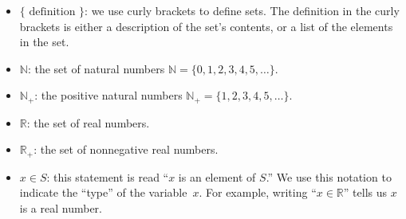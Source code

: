 		\begin{itemize}


			\item $\{ \textrm{  definition  } \}$:
				we use curly brackets to define sets.
				The definition in the curly brackets is either a description of the set's contents,
				or a list of the elements in the set.

			\item $\mathbb{N}$: the set of natural numbers $\mathbb{N} = \{0,1,2,3,4,5,\ldots\}$.

			\item $\mathbb{N}_+$: the positive natural numbers $\mathbb{N}_+ = \{1,2,3,4,5,\ldots\}$.

			\item	$\mathbb{R}$: the set of real numbers.

			\item	$\mathbb{R}_+$: the set of nonnegative real numbers.

			\item $x \in S$: this statement is read ``$x$ is an element of $S$.'' %
				We use this notation to indicate the ``type'' of the variable~$x$.
				For example,
				writing ``$x \in \mathbb{R}$'' tells us $x$ is a real number.






		\end{itemize}

